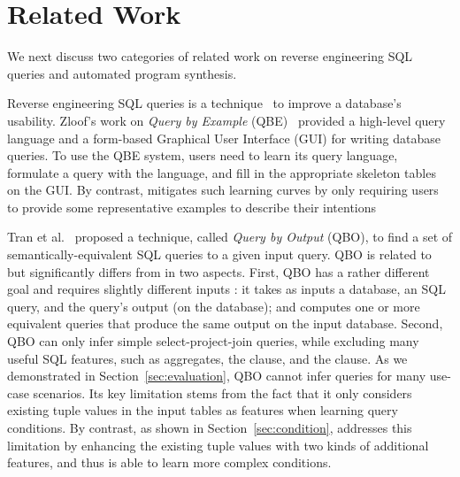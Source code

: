
\section{Related Work}
\label{sec:related}

\vspace{-1mm}


We next discuss two categories
of related work on reverse engineering SQL queries 
and automated program synthesis.



Reverse engineering SQL queries is a technique~\cite{Zloof:1975, Tran:2009, DasSarma:2010} to
improve a database's usability. 
Zloof's work on \textit{Query by Example} (QBE)~\cite{Zloof:1975}
provided a high-level query language and a
form-based Graphical User Interface (GUI) for
writing database queries. To use the QBE system, 
users need to learn its query language,
formulate a query with the language, and fill in
the appropriate skeleton tables on the GUI.
By contrast, \ourtool mitigates such learning curves
by only requiring users to provide some representative
examples to describe their intentions




Tran et al.~\cite{Tran:2009} proposed a technique,
called \textit{Query by Output} (QBO), 
to find a set of semantically-equivalent SQL queries
to a given input query. QBO is related to but
significantly differs from \ourtool in two aspects.
First, QBO has a rather different goal and requires
slightly different inputs : it takes as inputs a database,
an SQL query, and the query's output (on the database); and computes
one or more equivalent queries that produce the
same output on the input database.
Second, QBO can only infer simple select-project-join queries,
while excluding many useful SQL features, such as aggregates,
the  clause, and the 
clause. As we demonstrated in Section~\ref{sec:evaluation},
QBO cannot infer queries for many use-case scenarios.
Its key limitation stems from the fact that it
only considers existing tuple values
in the input tables as features when learning
query conditions. 
By contrast, as shown in Section~\ref{sec:condition},
\ourtool addresses this limitation by enhancing
the existing tuple values with two kinds of
additional features, and thus is able to learn more
complex conditions.


